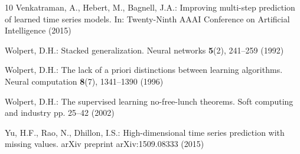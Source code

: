 \documentclass[smallcondensed]{svjour3}
\begin{document}
\begin{thebibliography}{10}
Venkatraman, A., Hebert, M., Bagnell, J.A.: Improving multi-step prediction of
  learned time series models.
\newblock In: Twenty-Ninth AAAI Conference on Artificial Intelligence (2015)

Wolpert, D.H.: Stacked generalization.
\newblock Neural networks \textbf{5}(2), 241--259 (1992)

Wolpert, D.H.: The lack of a priori distinctions between learning algorithms.
\newblock Neural computation \textbf{8}(7), 1341--1390 (1996)

Wolpert, D.H.: The supervised learning no-free-lunch theorems.
\newblock Soft computing and industry pp. 25--42 (2002)

Yu, H.F., Rao, N., Dhillon, I.S.: High-dimensional time series prediction with
  missing values.
\newblock arXiv preprint arXiv:1509.08333  (2015)

\end{thebibliography}
\end{document}
